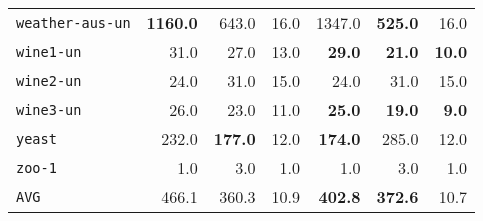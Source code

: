 \begin{tabular}{lrrrrrr}
\texttt{weather-aus-un} & \textbf{1160.0} & 643.0 & 16.0 & 1347.0 & \textbf{525.0} & 16.0\\
\texttt{wine1-un} & 31.0 & 27.0 & 13.0 & \textbf{29.0} & \textbf{21.0} & \textbf{10.0}\\
\texttt{wine2-un} & 24.0 & 31.0 & 15.0 & 24.0 & 31.0 & 15.0\\
\texttt{wine3-un} & 26.0 & 23.0 & 11.0 & \textbf{25.0} & \textbf{19.0} & \textbf{9.0}\\
\texttt{yeast} & 232.0 & \textbf{177.0} & 12.0 & \textbf{174.0} & 285.0 & 12.0\\
\texttt{zoo-1} & 1.0 & 3.0 & 1.0 & 1.0 & 3.0 & 1.0\\
\texttt{AVG} & 466.1 & 360.3 & 10.9 & \textbf{402.8} & \textbf{372.6} & 10.7\\
\bottomrule
\end{tabular}
